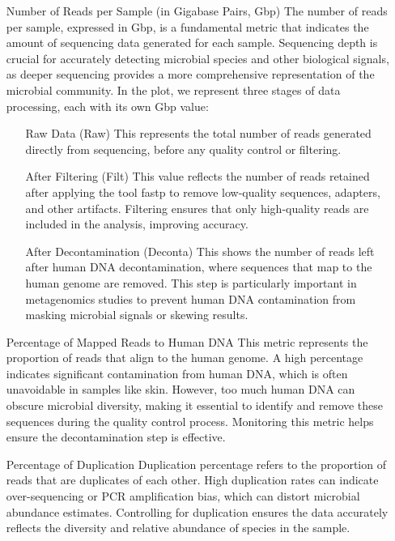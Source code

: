 \begin{itemize}
    \item[Number of Reads per Sample (in Gigabase Pairs, Gbp)] The number of reads per sample, expressed in Gbp, is a 
    fundamental metric that indicates the amount of sequencing data generated for each sample. Sequencing depth is 
    crucial for accurately detecting microbial species and other biological signals, as deeper sequencing provides a more 
    comprehensive representation of the microbial community. In the plot, we represent three stages of data processing, 
    each with its own Gbp value:
    \begin{itemize}
        \item[Raw Data (Raw)] This represents the total number of reads generated directly from sequencing, before any 
        quality control or filtering.
        \item[After Filtering (Filt)] This value reflects the number of reads retained after applying the tool fastp to 
        remove low-quality sequences, adapters, and other artifacts. Filtering ensures that only high-quality reads are 
        included in the analysis, improving accuracy.
        \item[After Decontamination (Deconta)] This shows the number of reads left after human DNA decontamination, 
        where sequences that map to the human genome are removed. This step is particularly important in metagenomics 
        studies to prevent human DNA contamination from masking microbial signals or skewing results.
    \end{itemize}
    \item[Percentage of Mapped Reads to Human DNA] This metric represents the proportion of reads that align to the human 
    genome. A high percentage indicates significant contamination from human DNA, which is often unavoidable in samples 
    like skin. However, too much human DNA can obscure microbial diversity, making it essential to identify and remove 
    these sequences during the quality control process. Monitoring this metric helps ensure the decontamination step is 
    effective.
    \item[Percentage of Duplication] Duplication percentage refers to the proportion of reads that are duplicates of 
    each other. High duplication rates can indicate over-sequencing or PCR amplification bias, which can distort microbial 
    abundance estimates. Controlling for duplication ensures the data accurately reflects the diversity and relative 
    abundance of species in the sample.

\end{itemize}
